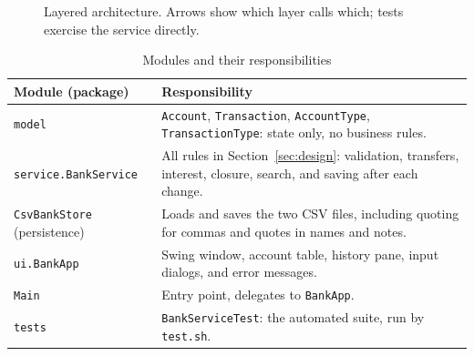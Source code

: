 \documentclass[11pt,a4paper]{report}
\begin{document}
\begin{figure}[h]
    \centering
    \caption{Layered architecture. Arrows show which layer calls which; tests exercise the service directly.}
    \label{fig:architecture}
\end{figure}

\begin{table}[h]
    \centering
    \caption{Modules and their responsibilities}
    \begin{tabular}{p{4.5cm}p{9.5cm}}
        \toprule
        \textbf{Module (package)} & \textbf{Responsibility} \\
        \midrule
        \texttt{model} & \texttt{Account}, \texttt{Transaction}, \texttt{AccountType}, \texttt{TransactionType}: state only, no business rules. \\
        \texttt{service.BankService} & All rules in Section~\ref{sec:design}: validation, transfers, interest, closure, search, and saving after each change. \\
        \texttt{CsvBankStore} (persistence) & Loads and saves the two CSV files, including quoting for commas and quotes in names and notes. \\
        \texttt{ui.BankApp} & Swing window, account table, history pane, input dialogs, and error messages. \\
        \texttt{Main} & Entry point, delegates to \texttt{BankApp}. \\
        \texttt{tests} & \texttt{BankServiceTest}: the automated suite, run by \texttt{test.sh}. \\
        \bottomrule
    \end{tabular}
\end{table}
\end{document}
